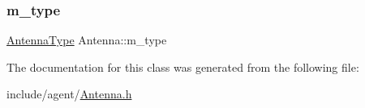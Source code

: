 \mbox{\label{class_antenna_a6b68373c8b139e8dafc4c11480eee0e1}} 
\subsubsection{\texorpdfstring{m\+\_\+type}{m\_type}}
{\footnotesize\ttfamily \hyperlink{_antenna_type_8h_a7b678b5cb9dedc607131200119d96b16}{Antenna\+Type} Antenna\+::m\+\_\+type\hspace{0.3cm}{\ttfamily [private]}}



The documentation for this class was generated from the following file\+:\begin{DoxyCompactItemize}
\item 
include/agent/\hyperlink{_antenna_8h}{Antenna.\+h}\end{DoxyCompactItemize}
